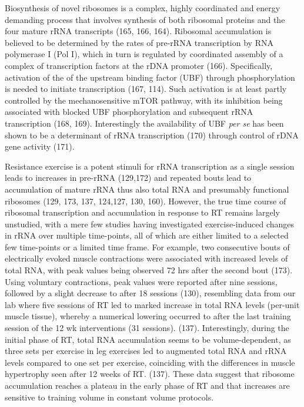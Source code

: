 \documentclass[twoside,10pt]{gihclass} %
\begin{document}
Biosynthesis of novel ribosomes is a complex, highly coordinated and energy demanding process that involves synthesis of both ribosomal proteins and the four mature rRNA transcripts
(165, 166, 164).
Ribosomal accumulation is believed to be determined by the rates of pre-rRNA transcription by RNA polymerase I (Pol I), which in turn is regulated by coordinated assembly of a complex of transcription factors at the rDNA promoter
(166).
Specifically, activation of the of the upstream binding factor (UBF) through phosphorylation is needed to initiate transcription
(167, 114).
Such activation is at least partly controlled by the mechanosensitive mTOR pathway, with its inhibition being associated with blocked UBF phosphorylation and subsequent rRNA transcription
(168, 169).
Interestingly the availability of UBF \emph{per se} has been shown to be a determinant of rRNA transcription
(170)
through control of rDNA gene activity
(171).

Resistance exercise is a potent stimuli for rRNA transcription as a single session leads to increases in pre-rRNA
(129,172)
and repeated bouts lead to accumulation of mature rRNA thus also total RNA and presumably functional ribosomes
(129, 173, 137, 124,127, 130, 160).
However, the true time course of ribosomal transcription and accumulation in response to RT remains largely unstudied, with a mere few studies having investigated exercise-induced changes in rRNA over multiple time-points, all of which are either limited to a selected few time-points or a limited time frame.
For example, two consecutive bouts of electrically evoked muscle contractions were associated with increased levels of total RNA, with peak values being observed 72 hrs after the second bout
(173).
Using voluntary contractions, peak values were reported after nine sessions, followed by a slight decrease to after 18 sessions (130),
resembling data from our lab where five sessions of RT led to marked increase in total RNA levels (per-unit muscle tissue), whereby a numerical lowering occurred to after the last training session of the 12 wk interventions (31 sessions).
(137).
Interestingly, during the initial phase of RT, total RNA accumulation seems to be volume-dependent, as three sets per exercise in leg exercises led to augmented total RNA and rRNA levels compared to one set per exercise, coinciding with the differences in muscle hypertrophy seen after 12 weeks of RT.
(137).
These data suggest that ribosome accumulation reaches a plateau in the early phase of RT and that increases are sensitive to training volume in constant volume protocols.
\end{document}
